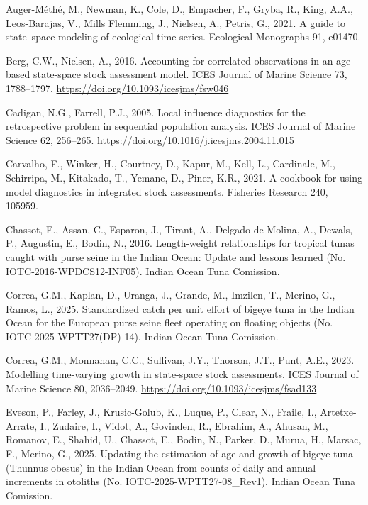 \documentclass[
]{scrartcl}
\newlength{\cslhangindent}
\newenvironment{CSLReferences}[2] %
 {\begin{list}{}{%
  \setlength{\itemindent}{0pt}
  \setlength{\leftmargin}{0pt}
  \setlength{\parsep}{0pt}
  \ifodd #1
   \setlength{\leftmargin}{\cslhangindent}
   \setlength{\itemindent}{-1\cslhangindent}
  \fi
  \setlength{\itemsep}{#2\baselineskip}}}
 {\end{list}}
\begin{document}
\label{refs}
\begin{CSLReferences}{1}{0}
Auger-Méthé, M., Newman, K., Cole, D., Empacher, F., Gryba, R., King,
A.A., Leos-Barajas, V., Mills Flemming, J., Nielsen, A., Petris, G.,
2021. A guide to state--space modeling of ecological time series.
Ecological Monographs 91, e01470.

Berg, C.W., Nielsen, A., 2016. Accounting for correlated observations in
an age-based state-space stock assessment model. ICES Journal of Marine
Science 73, 1788--1797. \url{https://doi.org/10.1093/icesjms/fsw046}

Cadigan, N.G., Farrell, P.J., 2005. Local influence diagnostics for the
retrospective problem in sequential population analysis. ICES Journal of
Marine Science 62, 256--265.
\url{https://doi.org/10.1016/j.icesjms.2004.11.015}

Carvalho, F., Winker, H., Courtney, D., Kapur, M., Kell, L., Cardinale,
M., Schirripa, M., Kitakado, T., Yemane, D., Piner, K.R., 2021. A
cookbook for using model diagnostics in integrated stock assessments.
Fisheries Research 240, 105959.

Chassot, E., Assan, C., Esparon, J., Tirant, A., Delgado de Molina, A.,
Dewals, P., Augustin, E., Bodin, N., 2016. Length-weight relationships
for tropical tunas caught with purse seine in the {Indian Ocean}:
{Update} and lessons learned (No. IOTC-2016-WPDCS12-INF05). Indian Ocean
Tuna Comission.

Correa, G.M., Kaplan, D., Uranga, J., Grande, M., Imzilen, T., Merino,
G., Ramos, L., 2025. Standardized catch per unit effort of bigeye tuna
in the {Indian Ocean} for the {European} purse seine fleet operating on
floating objects (No. IOTC-2025-WPTT27(DP)-14). Indian Ocean Tuna
Comission.

Correa, G.M., Monnahan, C.C., Sullivan, J.Y., Thorson, J.T., Punt, A.E.,
2023. Modelling time-varying growth in state-space stock assessments.
ICES Journal of Marine Science 80, 2036--2049.
\url{https://doi.org/10.1093/icesjms/fsad133}

Eveson, P., Farley, J., Krusic-Golub, K., Luque, P., Clear, N., Fraile,
I., Artetxe-Arrate, I., Zudaire, I., Vidot, A., Govinden, R., Ebrahim,
A., Ahusan, M., Romanov, E., Shahid, U., Chassot, E., Bodin, N., Parker,
D., Murua, H., Marsac, F., Merino, G., 2025. Updating the estimation of
age and growth of bigeye tuna ({Thunnus} obesus) in the {Indian Ocean}
from counts of daily and annual increments in otoliths (No.
IOTC-2025-WPTT27-08\_Rev1). Indian Ocean Tuna Comission.


\end{CSLReferences}
\end{document}
